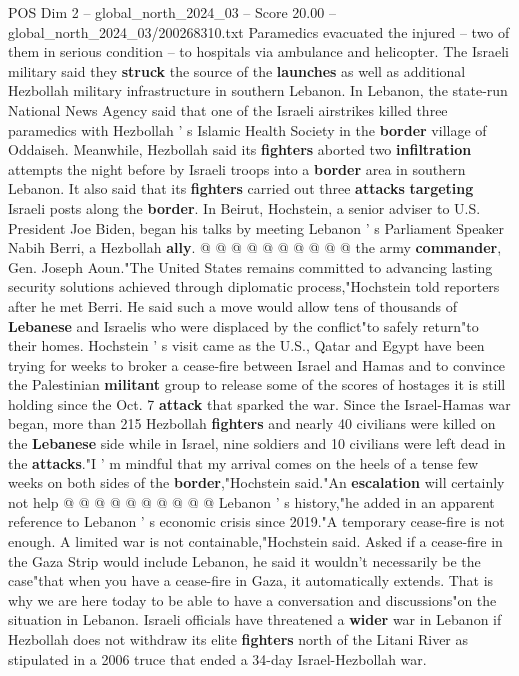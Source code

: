 \begin{textsample}{POS Dim 2 – global\_north\_2024\_03 – Score 20.00 – global\_north\_2024\_03/200268310.txt}
Paramedics evacuated the injured -- two of them in serious condition -- to hospitals via ambulance and helicopter.
The Israeli military said they \textbf{struck} the source of the \textbf{launches} as well as additional Hezbollah military infrastructure in southern Lebanon.
In Lebanon, the state-run National News Agency said that one of the Israeli airstrikes killed three paramedics with Hezbollah ' s Islamic Health Society in the \textbf{border} village of Oddaiseh.
Meanwhile, Hezbollah said its \textbf{fighters} aborted two \textbf{infiltration} attempts the night before by Israeli troops into a \textbf{border} area in southern Lebanon.
It also said that its \textbf{fighters} carried out three \textbf{attacks} \textbf{targeting} Israeli posts along the \textbf{border}.
In Beirut, Hochstein, a senior adviser to U.S.
President Joe Biden, began his talks by meeting Lebanon ' s Parliament Speaker Nabih Berri, a Hezbollah \textbf{ally}. @ @ @ @ @ @ @ @ @ @ the army \textbf{commander}, Gen.
Joseph Aoun."The United States remains committed to advancing lasting security solutions achieved through diplomatic process,"Hochstein told reporters after he met Berri.
He said such a move would allow tens of thousands of \textbf{Lebanese} and Israelis who were displaced by the conflict"to safely return"to their homes.
Hochstein ' s visit came as the U.S., Qatar and Egypt have been trying for weeks to broker a cease-fire between Israel and Hamas and to convince the Palestinian \textbf{militant} group to release some of the scores of hostages it is still holding since the Oct. 7 \textbf{attack} that sparked the war.
Since the Israel-Hamas war began, more than 215 Hezbollah \textbf{fighters} and nearly 40 civilians were killed on the \textbf{Lebanese} side while in Israel, nine soldiers and 10 civilians were left dead in the \textbf{attacks}."I ' m mindful that my arrival comes on the heels of a tense few weeks on both sides of the \textbf{border},"Hochstein said."An \textbf{escalation} will certainly not help @ @ @ @ @ @ @ @ @ @ Lebanon ' s history,"he added in an apparent reference to Lebanon ' s economic crisis since 2019."A temporary cease-fire is not enough.
A limited war is not containable,"Hochstein said.
Asked if a cease-fire in the Gaza Strip would include Lebanon, he said it wouldn't necessarily be the case"that when you have a cease-fire in Gaza, it automatically extends.
That is why we are here today to be able to have a conversation and discussions"on the situation in Lebanon.
Israeli officials have threatened a \textbf{wider} war in Lebanon if Hezbollah does not withdraw its elite \textbf{fighters} north of the Litani River as stipulated in a 2006 truce that ended a 34-day Israel-Hezbollah war.

\end{textsample}

